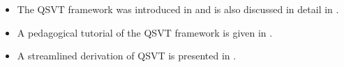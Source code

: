 \begin{refsection}
\begin{itemize}
    \item The QSVT framework was introduced in \cite{gilyen2018QSingValTransf} and is also discussed in detail in \cite{gilyen2018QSingValTransfThesis}.
    \item A pedagogical tutorial of the QSVT framework is given in \cite{martyn2021GrandUnificationQAlgs,lin2022LectureNotes}.
    \item A streamlined derivation of QSVT is presented in \cite{tang2023CSguideQSVT}.
\end{itemize}

\printbibliography[heading=secbib,segment=\therefsegment]

\end{refsection}